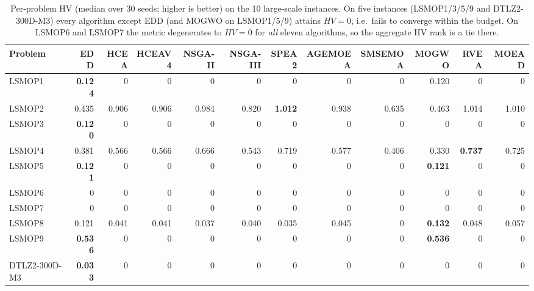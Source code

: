 \begin{table}[t]
\centering
\caption{Per-problem HV (median over 30 seeds; higher is better) on the
10 large-scale instances. On five instances (LSMOP1/3/5/9 and
DTLZ2-300D-M3) every algorithm except EDD (and MOGWO on LSMOP1/5/9)
attains $HV=0$, i.e.\ fails to converge within the budget. On LSMOP6 and
LSMOP7 the metric degenerates to $HV=0$ for \emph{all} eleven algorithms,
so the aggregate HV rank is a tie there.}
\label{tab:hv}
\setlength{\tabcolsep}{4pt}
\begin{tabular}{lrrrrrrrrrrr}
\toprule
Problem & EDD & HCEA & HCEAV4 & NSGA-II & NSGA-III & SPEA2 & AGEMOEA & SMSEMOA & MOGWO & RVEA & MOEAD \\
\midrule
LSMOP1        & \textbf{0.124} & 0 & 0 & 0 & 0 & 0 & 0 & 0 & 0.120 & 0 & 0 \\
LSMOP2        & 0.435 & 0.906 & 0.906 & 0.984 & 0.820 & \textbf{1.012} & 0.938 & 0.635 & 0.463 & 1.014 & 1.010 \\
LSMOP3        & \textbf{0.120} & 0 & 0 & 0 & 0 & 0 & 0 & 0 & 0 & 0 & 0 \\
LSMOP4        & 0.381 & 0.566 & 0.566 & 0.666 & 0.543 & 0.719 & 0.577 & 0.406 & 0.330 & \textbf{0.737} & 0.725 \\
LSMOP5        & \textbf{0.121} & 0 & 0 & 0 & 0 & 0 & 0 & 0 & \textbf{0.121} & 0 & 0 \\
LSMOP6        & 0 & 0 & 0 & 0 & 0 & 0 & 0 & 0 & 0 & 0 & 0 \\
LSMOP7        & 0 & 0 & 0 & 0 & 0 & 0 & 0 & 0 & 0 & 0 & 0 \\
LSMOP8        & 0.121 & 0.041 & 0.041 & 0.037 & 0.040 & 0.035 & 0.045 & 0 & \textbf{0.132} & 0.048 & 0.057 \\
LSMOP9        & \textbf{0.536} & 0 & 0 & 0 & 0 & 0 & 0 & 0 & \textbf{0.536} & 0 & 0 \\
DTLZ2-300D-M3 & \textbf{0.033} & 0 & 0 & 0 & 0 & 0 & 0 & 0 & 0 & 0 & 0 \\
\bottomrule
\end{tabular}
\end{table}

